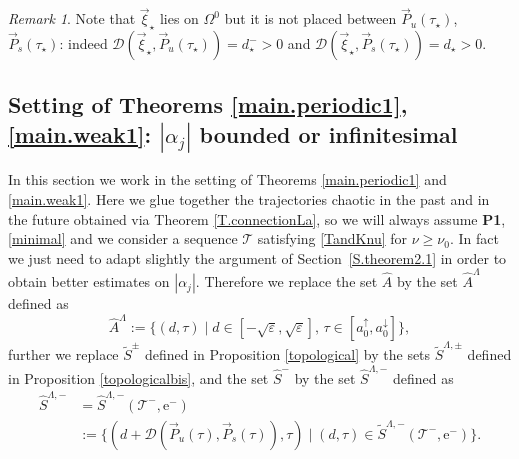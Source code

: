 \documentclass[10pt]{article}
\numberwithin{equation}{section}
\def\ep{\varepsilon}
\def\Om{\Omega}
\def\ee{{\mathrm e}}
\def\TT{{\mathcal T}}
\def\DDD{\mathscr{D}}
\def\aup{a^{\uparrow}}
\def\adown{a^{\downarrow}}
\def\P{\vec{P}}
\def\xxi{\vec{\xi}}
\newcommand\assump[1]{{\rm\textbf{#1}}}
\theoremstyle{definition}
\theoremstyle{remark}
\newtheorem{remark}[theorem]{Remark}
\begin{document}
 \begin{remark}\label{uselesspos}
 Note that $\xxi_\star$ lies on $\Om^0$ but it is not placed between $\P_u(\tau_\star)$, $\P_s(\tau_\star)$:
 indeed $\DDD(\xxi_\star, \P_u(\tau_\star))= d^-_\star>0$ and $\DDD(\xxi_\star, \P_s(\tau_\star))=  d_\star>0$.
 \end{remark}



\subsection{Setting of Theorems \ref{main.periodic1},
\ref{main.weak1}:  $|\alpha_j|$ bounded or infinitesimal}\label{S.theorem2.2}

In this section
we work in the setting of Theorems \ref{main.periodic1}
and \ref{main.weak1}. Here we glue together the trajectories chaotic in the past and in the future  obtained via Theorem \ref{T.connectionLa}, so we will always assume  \assump{P1}, \eqref{minimal} and we consider a sequence
$\TT$ satisfying \eqref{TandKnu}  for $\nu \ge\nu_0$.
In fact we just need to adapt slightly the argument of Section~\ref{S.theorem2.1} in order to obtain better estimates on $|\alpha_j|$.
Therefore we replace the set $\hat{A}$ by the set $\hat{A}^{\Lambda}$ defined as
$$\hat{A}^{\Lambda}:= \{(d,\tau) \mid  d \in  [- \sqrt{\ep}, \sqrt{\ep} ] ,\, \tau \in [\aup_0,\adown_0]    \}, $$
 further we replace $\tilde{S}^{\pm}$  defined in Proposition  \ref{topological}   by the sets
$\tilde{S}^{\Lambda,\pm}$ %
defined in Proposition  \ref{topologicalbis},
  and the set $\hat{S}^{-}$ by the set $\hat{S}^{\Lambda,-}$ defined as
\begin{equation}\label{defhatSbis}
\begin{split}
      \hat{S}^{\Lambda,-} &= \hat{S}^{\Lambda,-}(\TT^-, \ee^-)\\
     &:= \{ (d+\DDD(\P_u(\tau), \P_s(\tau)), \tau) \mid   (d,\tau) \in
     \tilde{S}^{\Lambda,-}(\TT^-, \ee^-)
     \}.
\end{split}
\end{equation}
\end{document}
